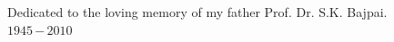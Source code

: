 \thispagestyle{empty}
{}

\vspace*{5cm}
\medskip

\begin{center}
    Dedicated to the loving memory of my father Prof. Dr. S.K. Bajpai. \\ \medskip
    $1945$\,$-$\,$2010$
\end{center}
